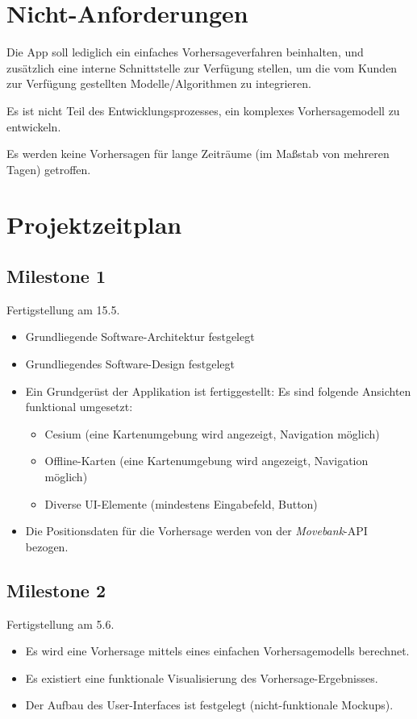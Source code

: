 \documentclass[12pt]{article} %
\begin{document}
 \section{Nicht-Anforderungen} \label{nicht-anforderungen}

Die App soll lediglich ein einfaches Vorhersageverfahren beinhalten, und zusätzlich eine interne Schnittstelle zur Verfügung stellen, um die vom Kunden zur Verfügung gestellten Modelle/Algorithmen zu integrieren.

Es ist nicht Teil des Entwicklungsprozesses, ein komplexes Vorhersagemodell zu entwickeln.

Es werden keine Vorhersagen für lange Zeiträume (im Maßstab von mehreren Tagen) getroffen.


\newpage
\section{Projektzeitplan} \label{zeitplan}

\subsection*{Milestone 1}
Fertigstellung am 15.5.
\begin{itemize} 
	\item Grundliegende Software-Architektur festgelegt
	\item Grundliegendes Software-Design festgelegt
	\item Ein Grundgerüst der Applikation ist fertiggestellt: Es sind folgende Ansichten funktional umgesetzt:
	\begin{itemize} 
		\item Cesium (eine Kartenumgebung wird angezeigt, Navigation möglich)
		\item Offline-Karten (eine Kartenumgebung wird angezeigt, Navigation möglich)
		\item Diverse UI-Elemente (mindestens Eingabefeld, Button)
	\end{itemize} 
	\item Die Positionsdaten für die Vorhersage werden von der \textit{Movebank}-API bezogen.
\end{itemize} 

\vspace{1em}

\subsection*{Milestone 2}
Fertigstellung am 5.6.
\begin{itemize} 
	\item Es wird eine Vorhersage mittels eines einfachen Vorhersagemodells berechnet.
	\item Es existiert eine funktionale Visualisierung des Vorhersage-Ergebnisses.
	\item Der Aufbau des User-Interfaces ist festgelegt (nicht-funktionale Mockups).
\end{itemize}
\end{document}
